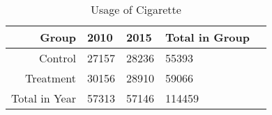 \begin{table}[ht]
\centering
\begin{tabular}{rllll}
  \hline
 Group & 2010 & 2015 & Total in Group \\ 
  \hline
 Control & 27157 & 28236 & 55393 \\ 
  Treatment & 30156 & 28910 & 59066 \\ 
  Total in Year  & 57313 & 57146 & 114459 \\ 
   \hline
\end{tabular}
\caption{Usage of Cigarette}
\end{table}
